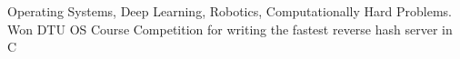 \documentclass[]{deedy-resume-openfont}
\begin{document}
\vspace{8pt}

\begin{adjustwidth}{0.55cm}{1.25cm}
   Operating Systems, Deep Learning, Robotics, Computationally Hard Problems. \\
  Won DTU OS Course Competition for writing the fastest reverse hash server in C
\end{adjustwidth}

\vspace{10pt}
\end{document}
